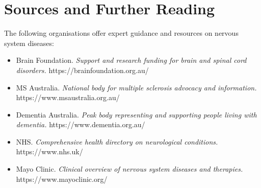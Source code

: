 \section*{Sources and Further Reading}
The following organisations offer expert guidance and resources on nervous system diseases:
\begin{itemize}
    \item Brain Foundation. \textit{Support and research funding for brain and spinal cord disorders.} https://brainfoundation.org.au/
    \item MS Australia. \textit{National body for multiple sclerosis advocacy and information.} https://www.msaustralia.org.au/
    \item Dementia Australia. \textit{Peak body representing and supporting people living with dementia.} https://www.dementia.org.au/
    \item NHS. \textit{Comprehensive health directory on neurological conditions.} https://www.nhs.uk/
    \item Mayo Clinic. \textit{Clinical overview of nervous system diseases and therapies.} https://www.mayoclinic.org/
\end{itemize}
